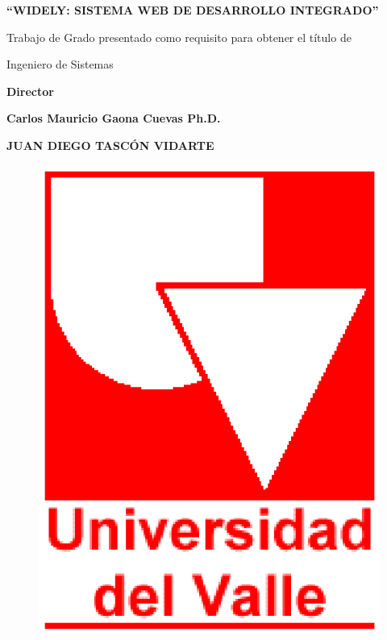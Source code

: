 \newpage


\begin{center} \textbf{\newline\newline} \end{center}
\begin{center} \textbf{``WIDELY: SISTEMA WEB DE DESARROLLO INTEGRADO''} \end{center}

\vspace{5em}

\begin{center} Trabajo de Grado presentado como requisito para obtener el título de\end{center}
\begin{center} Ingeniero de Sistemas \end{center}

\vspace{1em}

\begin{center} \textbf{ Director } \end{center}
\begin{center} \textbf{ Carlos Mauricio Gaona Cuevas Ph.D. } \end{center}

\vspace{5em}

\begin{center} \textbf{JUAN DIEGO TASCÓN VIDARTE} \end{center}

\vspace{3em}


\begin{figure}[h]
	\centering
	\includegraphics[scale=0.3]{./img/uvlogo}
	\label{img:uvlogo-p2}
\end{figure}

